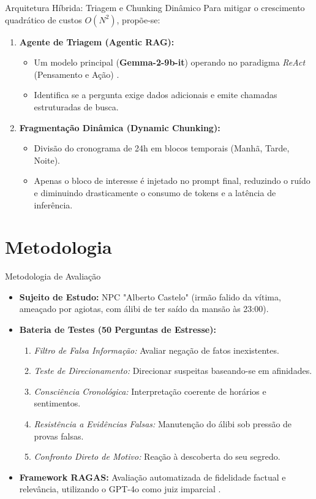 \documentclass[11pt]{beamer}
\begin{document}
\begin{frame}{Arquitetura Híbrida: Triagem e Chunking Dinâmico}
Para mitigar o crescimento quadrático de custos $O(N^2)$, propõe-se:
\begin{enumerate}
    \item \textbf{Agente de Triagem (Agentic RAG):}
    \begin{itemize}
        \item Um modelo principal (\textbf{Gemma-2-9b-it}) operando no paradigma \textit{ReAct} (Pensamento e Ação) \cite{yao2022react}.
        \item Identifica se a pergunta exige dados adicionais e emite chamadas estruturadas de busca.
    \end{itemize}
    \item \textbf{Fragmentação Dinâmica (Dynamic Chunking):}
    \begin{itemize}
        \item Divisão do cronograma de 24h em blocos temporais (Manhã, Tarde, Noite).
        \item Apenas o bloco de interesse é injetado no prompt final, reduzindo o ruído e diminuindo drasticamente o consumo de tokens e a latência de inferência.
    \end{itemize}
\end{enumerate}
\end{frame}

\section{Metodologia}

\begin{frame}{Metodologia de Avaliação}
\begin{itemize}
    \item \textbf{Sujeito de Estudo:} NPC "Alberto Castelo" (irmão falido da vítima, ameaçado por agiotas, com álibi de ter saído da mansão às 23:00).
    \item \textbf{Bateria de Testes (50 Perguntas de Estresse):}
    \begin{enumerate}
        \item \textit{Filtro de Falsa Informação:} Avaliar negação de fatos inexistentes.
        \item \textit{Teste de Direcionamento:} Direcionar suspeitas baseando-se em afinidades.
        \item \textit{Consciência Cronológica:} Interpretação coerente de horários e sentimentos.
        \item \textit{Resistência a Evidências Falsas:} Manutenção do álibi sob pressão de provas falsas.
        \item \textit{Confronto Direto de Motivo:} Reação à descoberta do seu segredo.
    \end{enumerate}
    \item \textbf{Framework RAGAS:} Avaliação automatizada de fidelidade factual e relevância, utilizando o GPT-4o como juiz imparcial \cite{es2023ragas}.
\end{itemize}
\end{frame}
\end{document}

